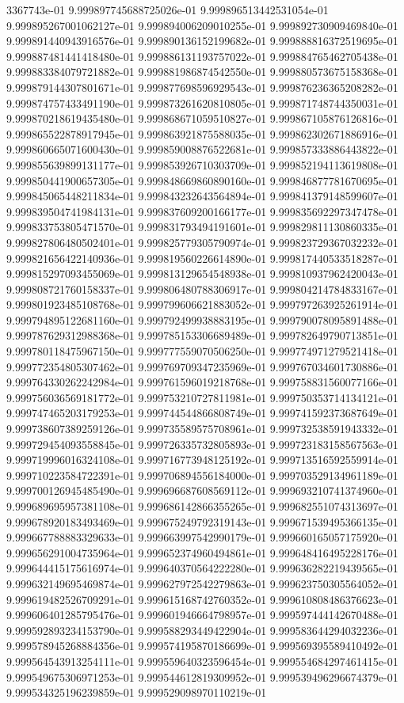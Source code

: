 3367743e-01	9.999897745688725026e-01	9.999896513442531054e-01	9.999895267001062127e-01	9.999894006209010255e-01	9.999892730909469840e-01	9.999891440943916576e-01	9.999890136152199682e-01	9.999888816372519695e-01	9.999887481441418480e-01	9.999886131193757022e-01	9.999884765462705438e-01	9.999883384079721882e-01	9.999881986874542550e-01	9.999880573675158368e-01	9.999879144307801671e-01	9.999877698596929543e-01	9.999876236365208282e-01	9.999874757433491190e-01	9.999873261620810805e-01	9.999871748744350031e-01	9.999870218619435480e-01	9.999868671059510827e-01	9.999867105876126816e-01	9.999865522878917945e-01	9.999863921875588035e-01	9.999862302671886916e-01	9.999860665071600430e-01	9.999859008876522681e-01	9.999857333886443822e-01	9.999855639899131177e-01	9.999853926710303709e-01	9.999852194113619808e-01	9.999850441900657305e-01	9.999848669860890160e-01	9.999846877781670695e-01	9.999845065448211834e-01	9.999843232643564894e-01	9.999841379148599607e-01	9.999839504741984131e-01	9.999837609200166177e-01	9.999835692297347478e-01	9.999833753805471570e-01	9.999831793494191601e-01	9.999829811130860335e-01	9.999827806480502401e-01	9.999825779305790974e-01	9.999823729367032232e-01	9.999821656422140936e-01	9.999819560226614890e-01	9.999817440533518287e-01	9.999815297093455069e-01	9.999813129654548938e-01	9.999810937962420043e-01	9.999808721760158337e-01	9.999806480788306917e-01	9.999804214784833167e-01	9.999801923485108768e-01	9.999799606621883052e-01	9.999797263925261914e-01	9.999794895122681160e-01	9.999792499938883195e-01	9.999790078095891488e-01	9.999787629312988368e-01	9.999785153306689489e-01	9.999782649790713851e-01	9.999780118475967150e-01	9.999777559070506250e-01	9.999774971279521418e-01	9.999772354805307462e-01	9.999769709347235969e-01	9.999767034601730886e-01	9.999764330262242984e-01	9.999761596019218768e-01	9.999758831560077166e-01	9.999756036569181772e-01	9.999753210727811981e-01	9.999750353714134121e-01	9.999747465203179253e-01	9.999744544866808749e-01	9.999741592373687649e-01	9.999738607389259126e-01	9.999735589575708961e-01	9.999732538591943332e-01	9.999729454093558845e-01	9.999726335732805893e-01	9.999723183158567563e-01	9.999719996016324108e-01	9.999716773948125192e-01	9.999713516592559914e-01	9.999710223584722391e-01	9.999706894556184000e-01	9.999703529134961189e-01	9.999700126945485490e-01	9.999696687608569112e-01	9.999693210741374960e-01	9.999689695957381108e-01	9.999686142866355265e-01	9.999682551074313697e-01	9.999678920183493469e-01	9.999675249792319143e-01	9.999671539495366135e-01	9.999667788883329633e-01	9.999663997542990179e-01	9.999660165057175920e-01	9.999656291004735964e-01	9.999652374960494861e-01	9.999648416495228176e-01	9.999644415175616974e-01	9.999640370564222280e-01	9.999636282219439565e-01	9.999632149695469874e-01	9.999627972542279863e-01	9.999623750305564052e-01	9.999619482526709291e-01	9.999615168742760352e-01	9.999610808486376623e-01	9.999606401285795476e-01	9.999601946664798957e-01	9.999597444142670488e-01	9.999592893234153790e-01	9.999588293449422904e-01	9.999583644294032236e-01	9.999578945268884356e-01	9.999574195870186699e-01	9.999569395589410492e-01	9.999564543913254111e-01	9.999559640323596454e-01	9.999554684297461415e-01	9.999549675306971253e-01	9.999544612819309952e-01	9.999539496296674379e-01	9.999534325196239859e-01	9.999529098970110219e-01